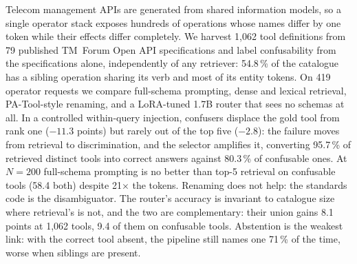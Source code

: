 Telecom management APIs are generated from shared information models, so a
single operator stack exposes hundreds of operations whose names differ by one
token while their effects differ completely. We harvest 1,062 tool
definitions from 79 published TM~Forum Open API specifications and label
confusability from the specifications alone, independently of any retriever:
54.8\,\% of the catalogue has a sibling operation sharing its verb and
most of its entity tokens. On 419 operator requests we compare full-schema
prompting, dense and lexical retrieval, PA-Tool-style renaming, and a
LoRA-tuned 1.7B router that sees no schemas at all. In a controlled within-query injection, confusers displace the gold tool from
rank one ($-11.3$ points) but rarely out of the top five ($-2.8$): the failure
moves from retrieval to discrimination, and the selector amplifies it,
converting 95.7\,\% of retrieved distinct tools into correct answers against
80.3\,\% of confusable ones. At $N=200$ full-schema prompting is no better than top-5 retrieval on
confusable tools (58.4 both) despite 21$\times$ the tokens. Renaming does not help: the standards code is the disambiguator.
The router's accuracy is invariant to catalogue size where retrieval's is not,
and the two are complementary: their union gains 8.1 points at 1,062 tools,
9.4 of them on confusable tools.
Abstention is the weakest link: with the correct tool absent, the pipeline
still names one 71\,\% of the time, worse when siblings are present.
